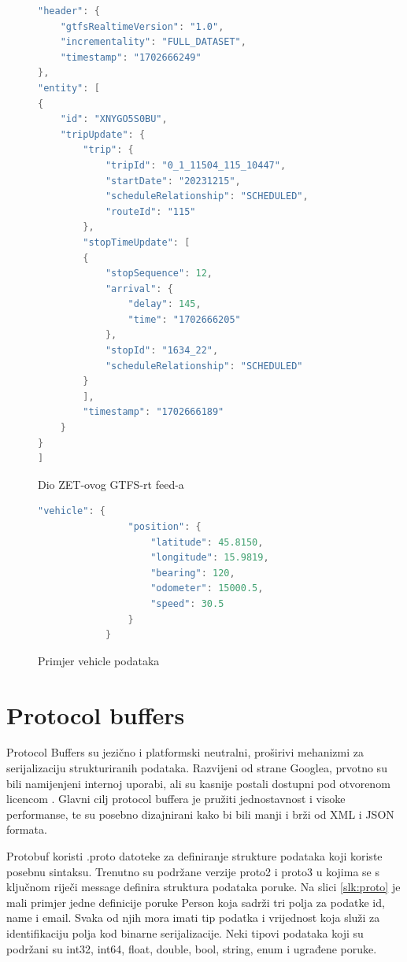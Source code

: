 \documentclass[zavrsnirad]{fer}
\begin{document}
\begin{figure}[H]
	\centering
	

	\begin{minipage}[htb]{0.58\linewidth}
		\centering
		
		\begin{lstlisting}[language=Java]
"header": {
	"gtfsRealtimeVersion": "1.0",
	"incrementality": "FULL_DATASET",
	"timestamp": "1702666249"
},
"entity": [
{
	"id": "XNYGO5S0BU",
	"tripUpdate": {
		"trip": {
			"tripId": "0_1_11504_115_10447",
			"startDate": "20231215",
			"scheduleRelationship": "SCHEDULED",
			"routeId": "115"
		},
		"stopTimeUpdate": [
		{
			"stopSequence": 12,
			"arrival": {
				"delay": 145,
				"time": "1702666205"
			},
			"stopId": "1634_22",
			"scheduleRelationship": "SCHEDULED"
		}
		],
		"timestamp": "1702666189"
	}
}
]
		\end{lstlisting} 
		\caption{Dio ZET-ovog GTFS-rt feed-a}
		\label{slk:reply1}
	\end{minipage}
	\hfill
	\begin{minipage}[htb]{0.38\linewidth}
		\centering
		\begin{lstlisting}[language=Java]
			"vehicle": {
				"position": {
					"latitude": 45.8150,
					"longitude": 15.9819,
					"bearing": 120,
					"odometer": 15000.5,
					"speed": 30.5
				}
			}
		\end{lstlisting}
		\caption{Primjer vehicle podataka}
		\label{slk:reply2}
	\end{minipage}
\end{figure}


\newpage
\section[Protobuf]{Protocol buffers}
\label{sec:protobuf}

Protocol Buffers su jezično i platformski neutralni, proširivi mehanizmi za serijalizaciju strukturiranih podataka. Razvijeni od strane Googlea, prvotno su bili namijenjeni internoj uporabi, ali su kasnije postali dostupni pod otvorenom licencom \cite{protobuf}. Glavni cilj protocol buffera je pružiti jednostavnost i visoke performanse, te su posebno dizajnirani kako bi bili manji i brži od XML i JSON formata.


Protobuf koristi .proto datoteke za definiranje strukture podataka koji koriste posebnu sintaksu. Trenutno su podržane verzije proto2 i proto3 u kojima se s ključnom riječi message definira struktura podataka poruke. Na slici \ref{slk:proto} je mali primjer jedne definicije poruke Person koja sadrži tri polja za podatke id, name i email. Svaka od njih mora imati tip podatka i vrijednost koja služi za identifikaciju polja kod binarne serijalizacije. Neki tipovi podataka koji su podržani su int32, int64, float, double, bool, string, enum i ugrađene poruke.
\end{document}
